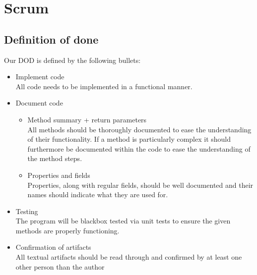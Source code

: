 \documentclass[a4paper,11pt,report]{report}
\begin{document}
\newpage
\section{Scrum}
	\subsection{Definition of done}
	Our DOD is defined by the following bullets:	
	\begin{itemize}	
				\item	Implement code
				\\ 	All code needs to be implemented in a functional manner.
				\item	Document code
					\begin{itemize}	
						\item Method summary + return parameters
						\\ All methods should be thoroughly documented to ease the understanding of their functionality. If a method is particularly complex it should furthermore be documented within the code to ease the understanding of the method steps.
						\item Properties and fields
						\\ Properties, along with regular fields, should be well documented and their names should indicate what they are used for.
					\end{itemize}
				\item	Testing
				\\ The program will be blackbox tested via unit tests to ensure the given methods are properly functioning.
				\item	Confirmation of artifacts
				\\ All textual artifacts should be read through and confirmed by at least one other person than the author
					\\ \\	
	\end{itemize}
\end{document}
